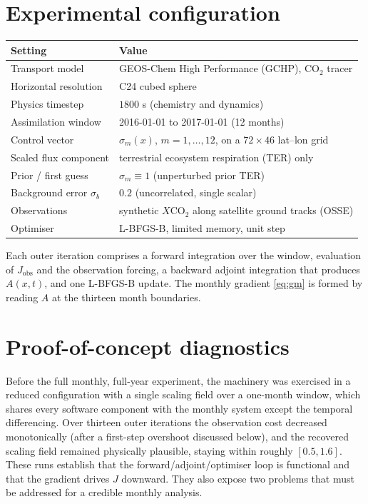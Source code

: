 \documentclass[12pt]{article}
\newcommand{\xco}{X\mathrm{CO}_2}
\newcommand{\co}{\mathrm{CO}_2}
\begin{document}
\section{Experimental configuration}

\begin{center}
\begin{tabular}{@{}ll@{}}
\toprule
Setting & Value \\
\midrule
Transport model & GEOS-Chem High Performance (GCHP), $\co$ tracer \\
Horizontal resolution & C24 cubed sphere \\
Physics timestep & $1800$ s (chemistry and dynamics) \\
Assimilation window & 2016-01-01 to 2017-01-01 (12 months) \\
Control vector & $\sigma_m(x)$, $m=1,\dots,12$, on a $72\times46$ lat--lon grid \\
Scaled flux component & terrestrial ecosystem respiration (TER) only \\
Prior / first guess & $\sigma_m \equiv 1$ (unperturbed prior TER) \\
Background error $\sigma_b$ & $0.2$ (uncorrelated, single scalar) \\
Observations & synthetic $\xco$ along satellite ground tracks (OSSE) \\
Optimiser & L-BFGS-B, limited memory, unit step \\
\bottomrule
\end{tabular}
\end{center}

\noindent
Each outer iteration comprises a forward integration over the window, evaluation
of $J_{\mathrm{obs}}$ and the observation forcing, a backward adjoint integration
that produces $A(x,t)$, and one L-BFGS-B update. The monthly gradient
\eqref{eq:gm} is formed by reading $A$ at the thirteen month boundaries.

\section{Proof-of-concept diagnostics}

Before the full monthly, full-year experiment, the machinery was exercised in a
reduced configuration with a single scaling field over a one-month window, which
shares every software component with the monthly system except the temporal
differencing. Over thirteen outer iterations the observation cost decreased
monotonically (after a first-step overshoot discussed below), and the recovered
scaling field remained physically plausible, staying within roughly
$[0.5,1.6]$. These runs establish that the forward/adjoint/optimiser loop is
functional and that the gradient drives $J$ downward. They also expose two
problems that must be addressed for a credible monthly analysis.
\end{document}
